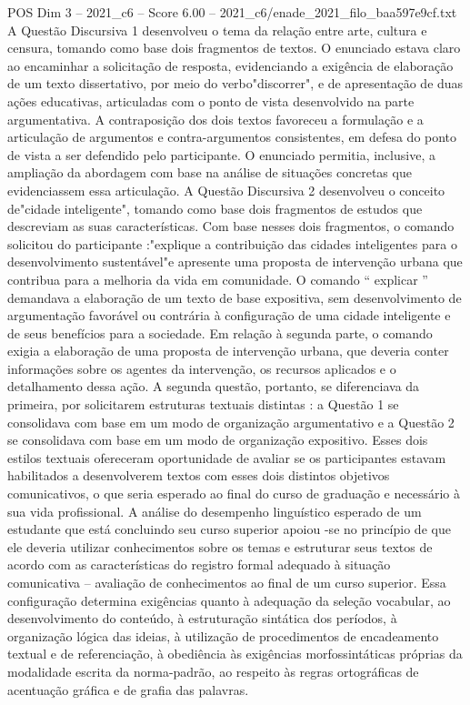 \begin{textsample}{POS Dim 3 – 2021\_c6 – Score 6.00 – 2021\_c6/enade\_2021\_filo\_baa597e9cf.txt}
A Questão Discursiva 1 desenvolveu o tema da relação entre arte, cultura e censura, tomando como base dois fragmentos de textos.
O enunciado estava claro ao encaminhar a solicitação de resposta, evidenciando a exigência de elaboração de um texto dissertativo, por meio do verbo"discorrer", e de apresentação de duas ações educativas, articuladas com o ponto de vista desenvolvido na parte argumentativa.
A contraposição dos dois textos favoreceu a formulação e a articulação de argumentos e contra-argumentos consistentes, em defesa do ponto de vista a ser defendido pelo participante.
O enunciado permitia, inclusive, a ampliação da abordagem com base na análise de situações concretas que evidenciassem essa articulação.
A Questão Discursiva 2 desenvolveu o conceito de"cidade inteligente", tomando como base dois fragmentos de estudos que descreviam as suas características.
Com base nesses dois fragmentos, o comando solicitou do participante :"explique a contribuição das cidades inteligentes para o desenvolvimento sustentável"e apresente uma proposta de intervenção urbana que contribua para a melhoria da vida em comunidade.
O comando “ explicar ” demandava a elaboração de um texto de base expositiva, sem desenvolvimento de argumentação favorável ou contrária à configuração de uma cidade inteligente e de seus benefícios para a sociedade.
Em relação à segunda parte, o comando exigia a elaboração de uma proposta de intervenção urbana, que deveria conter informações sobre os agentes da intervenção, os recursos aplicados e o detalhamento dessa ação.
A segunda questão, portanto, se diferenciava da primeira, por solicitarem estruturas textuais distintas : a Questão 1 se consolidava com base em um modo de organização argumentativo e a Questão 2 se consolidava com base em um modo de organização expositivo.
Esses dois estilos textuais ofereceram oportunidade de avaliar se os participantes estavam habilitados a desenvolverem textos com esses dois distintos objetivos comunicativos, o que seria esperado ao final do curso de graduação e necessário à sua vida profissional.
A análise do desempenho linguístico esperado de um estudante que está concluindo seu curso superior apoiou -se no princípio de que ele deveria utilizar conhecimentos sobre os temas e estruturar seus textos de acordo com as características do registro formal adequado à situação comunicativa – avaliação de conhecimentos ao final de um curso superior.
Essa configuração determina exigências quanto à adequação da seleção vocabular, ao desenvolvimento do conteúdo, à estruturação sintática dos períodos, à organização lógica das ideias, à utilização de procedimentos de encadeamento textual e de referenciação, à obediência às exigências morfossintáticas próprias da modalidade escrita da norma-padrão, ao respeito às regras ortográficas de acentuação gráfica e de grafia das palavras.

\end{textsample}
